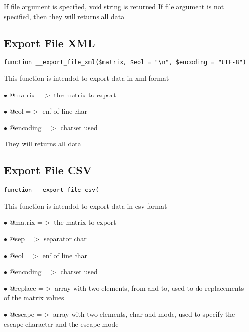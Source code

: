 \documentclass[a4paper]{book}
\begin{document}
If file argument is specified, void string is returned
If file argument is not specified, then they will returns all data

\hypertarget{toc115}{}
\subsection{Export File XML}

\begin{lstlisting}
function __export_file_xml($matrix, $eol = "\n", $encoding = "UTF-8")
\end{lstlisting}

This function is intended to export data in xml format

\begin{compactitem}
\item[\color{myblue}$\bullet$] @matrix   =$>$ the matrix to export
\item[\color{myblue}$\bullet$] @eol      =$>$ enf of line char
\item[\color{myblue}$\bullet$] @encoding =$>$ charset used
\end{compactitem}

They will returns all data

\hypertarget{toc116}{}
\subsection{Export File CSV}

\begin{lstlisting}
function __export_file_csv(
\end{lstlisting}

This function is intended to export data in csv format

\begin{compactitem}
\item[\color{myblue}$\bullet$] @matrix   =$>$ the matrix to export
\item[\color{myblue}$\bullet$] @sep      =$>$ separator char
\item[\color{myblue}$\bullet$] @eol      =$>$ enf of line char
\item[\color{myblue}$\bullet$] @encoding =$>$ charset used
\item[\color{myblue}$\bullet$] @replace  =$>$ array with two elements, from and to, used to do replacements of the matrix values
\item[\color{myblue}$\bullet$] @escape   =$>$ array with two elements, char and mode, used to specify the escape character and the
             escape mode
\end{compactitem}
\end{document}
